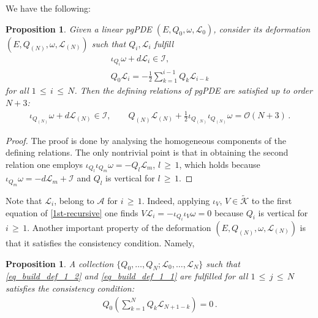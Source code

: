 \documentclass[a4paper,12pt]{article}
\numberwithin{equation}{section} %
\renewcommand{\geq}{\,{\geqslant}\,}
\renewcommand{\leq}{\,{\leqslant}\,}
\newcommand{\algA}{\mathcal{A}}
\def\cI{\mathcal{I}}
\def\cK{\mathcal{K}}
\def\cL{\mathcal{L}}
\newcommand{\wker}{{\widetilde{\cK}}}
\newcommand{\h}{\cL}
\newcommand{\order}[1]{\mathcal{O}(#1)}
\newtheorem{proposition}[thm]{Proposition}
\begin{document}
We have the following:
\begin{proposition}\label{prop:main-rec}
Given a linear pgPDE $(E,Q_0,\omega,\h_0)$, consider its deformation  $(E,Q_{(N)},\omega,\h_{(N)})$ such that $Q_i, \h_i$ fulfill
	\begin{gather}\label{eq_build_def_1_2}
		\iota_{Q_i}\omega + d\h_i  \in \mathcal{I},  \\
        \label{eq_build_def_1_1}
		Q_0\h_i = -\frac{1}{2}\sum_{k=1}^{i-1}Q_k \h_{i-k}
	\end{gather}
	for all $1\leq i\leq N$. Then the defining relations of  pgPDE are satisfied up to order $N+3$:
	\begin{align}
    \label{1st-recursive}
		\iota_{Q_{(N)}}\omega + d\h_{(N)} \in \cI, \qquad Q_{(N)}\h_{(N)} + \frac{1}{2}\iota_{Q_{(N)}}\iota_{Q_{(N)}} \omega = \order{N+3}\,.
	\end{align}
    \end{proposition}
\begin{proof} The proof is done by analysing the homogeneous components of the defining relations. The only nontrivial point is that in obtaining the second relation one employs $\iota_{Q_l}\iota_{Q_m}\omega=-Q_l\cL_m$, $l\geq 1$,  which holds because
    $\iota_{Q_m}\omega=-d\cL_m+\cI$ and $Q_l$ is vertical for $l\geq 1$.
\end{proof}
Note that $\cL_i$, belong to $\algA$ for $i\geq 1$. Indeed, applying $\iota_V$, $V\in \wker$ to the first equation of \eqref{1st-recursive} one finds $V\cL_i=-\iota_{Q_i}\iota_V\omega=0$ because $Q_i$ is vertical for $i\geq 1$. Another important property of the deformation $(E,Q_{(N)},\omega,\h_{(N)})$ is that it satisfies the consistency condition. Namely,
\begin{proposition}\label{prop_consistency}
A collection $\{ Q_0,\dots,Q_{N}; \h_0,\dots,\h_{N} \}$ such that \eqref{eq_build_def_1_2} and  \eqref{eq_build_def_1_1} are fulfilled for all $1\leq j\leq N$ satisfies the consistency condition:
	\begin{align}
		\label{eq_consistency_1}
		Q_0\left( \sum_{k=1}^{N} Q_k \h_{N+1-k} \right) = 0\,.
	\end{align}
    \end{proposition}
\end{document}
